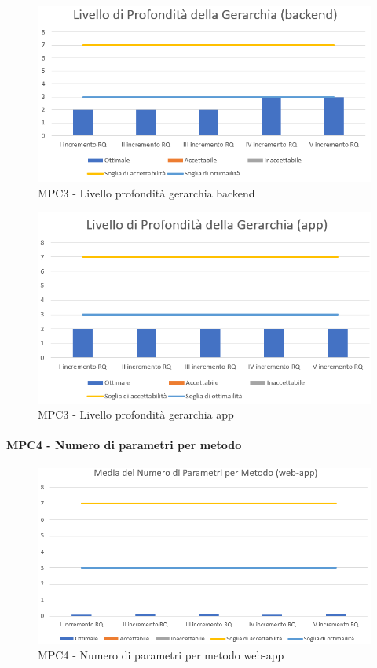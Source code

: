   \begin{figure}[h!]
    \centering
      \includegraphics[scale=1]{Immagini/LivProGer BE.PNG}
    \caption{MPC3 - Livello profondità gerarchia backend}
  \end{figure}

  \begin{figure}[h!]
    \centering
      \includegraphics[scale=1]{Immagini/LivProGer APP.PNG}
    \caption{MPC3 - Livello profondità gerarchia app}
  \end{figure}

  
  \newpage
  \paragraph{MPC4 - Numero di parametri per metodo}
  \begin{figure}[h!]
    \centering
      \includegraphics[scale=1]{Immagini/MediaNumPar WA.PNG}
    \caption{MPC4 - Numero di parametri per metodo web-app}
  \end{figure}

